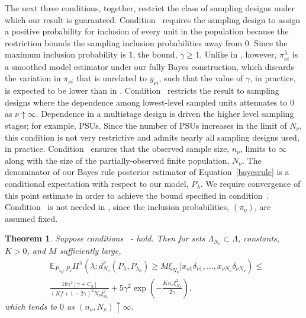 \documentclass[]{imsart}
\newtheorem{theorem}{Theorem}
\begin{document}
The next three conditions, together, restrict the class of sampling designs under which our result is guaranteed. Condition~ requires the sampling design to assign a positive probability for inclusion of every unit in the population because the restriction bounds the sampling inclusion probabilities away from $0$. Since the maximum inclusion probability is $1$, the bound, $\gamma \geq 1$.  Unlike in \citet{savitsky2016bayesian}, however, $\pi_{\nu i}^{\lambda}$ is a smoothed model estimator under our fully Bayes construction, which discards the variation in $\pi_{\nu i}$ that is unrelated to $y_{\nu i}$, such that the value of $\gamma$, in practice, is expected to be lower than in \citet{savitsky2016bayesian}. Condition~ restricts the result to sampling designs where the dependence among lowest-level sampled units attenuates to $0$ as $\nu\uparrow\infty$. Dependence in a multistage design is driven the higher level sampling stages; for example, PSUs.  Since the number of PSUs increases in the limit of $N_{\nu}$, this condition is not very restrictive and admits nearly all sampling designs used, in practice. Condition~ ensures that the observed sample size, $n_{\nu}$, limits to $\infty$ along with the size of the partially-observed finite population, $N_{\nu}$. The denominator of our Bayes rule posterior estimator of Equation~\eqref{bayesrule} is a conditional expectation with respect to our model, $P_{\lambda}$.  We require convergence of this point estimate in order to achieve the bound specified in condition~.  Condition~ is not needed in \citet{savitsky2016bayesian}, since the inclusion probabilities, $(\pi_{\nu})$, are assumed fixed.

\begin{theorem}
\label{main}
Suppose conditions ~- hold.  Then for sets $\Lambda_{N_{\nu}}\subset\Lambda$, constants, $K >0$, and $M$ sufficiently large,
\begin{align}\label{limit}
&\mathbb{E}_{P_{\lambda_{0}},P_{\nu}}\Pi^{\pi}\left(\lambda:d^{\pi}_{N_{\nu}}\left(P_{\lambda},P_{\lambda_{0}}\right) \geq M\xi_{N_{\nu}} \vert x_{\nu 1}\delta_{\nu 1},\ldots,x_{\nu N_{\nu}}\delta_{\nu N_{\nu}}\right) \leq\nonumber\\
&\frac{16\gamma^{2}\left[\gamma+C_{3}\right]}{\left(Kf + 1 - 2\gamma\right)^{2}N_{\nu}\xi_{N_{\nu}}^{2}} + 5\gamma^{2}\exp\left(-\frac{K n_{\nu}\xi_{N_{\nu}}^{2}}{2\gamma}\right),
\end{align}
which tends to $0$ as $\left(n_{\nu}, N_{\nu}\right)\uparrow\infty$.
\end{theorem}
\end{document}
